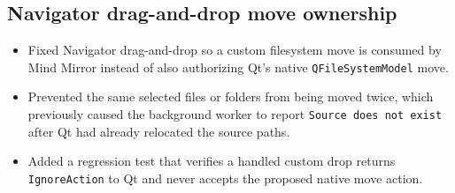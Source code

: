 \documentclass[a4paper]{article}
\title{}
\date{}
\author{Mohammad Rahmani}
\begin{document}
   \maketitle

   \begin{preview}
      \section{Navigator drag-and-drop move ownership}
      \begin{itemize}
         \item Fixed Navigator drag-and-drop so a custom filesystem move is consumed by Mind Mirror instead of also authorizing Qt's native \texttt{QFileSystemModel} move.
         \item Prevented the same selected files or folders from being moved twice, which previously caused the background worker to report \texttt{Source does not exist} after Qt had already relocated the source paths.
         \item Added a regression test that verifies a handled custom drop returns \texttt{IgnoreAction} to Qt and never accepts the proposed native move action.
      \end{itemize}
   \end{preview}

   
   
\end{document}

